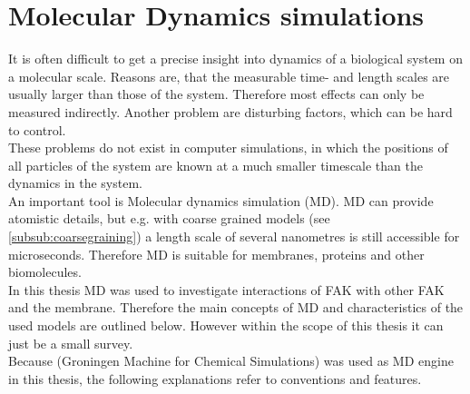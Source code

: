 \section{Molecular Dynamics simulations}
It is often difficult to get a precise insight into dynamics of a biological system on a molecular scale. Reasons are, that the measurable time- and length scales are usually larger than those of the system. Therefore most effects can only be measured indirectly. Another problem are disturbing factors, which can be hard to control.\\
These problems do not exist in computer simulations, in which the positions of all particles of the system are known at a much smaller timescale than the dynamics in the system.\\
An important tool is Molecular dynamics simulation (MD). MD can provide atomistic details, but e.g. with coarse grained models (see \autoref{subsub:coarsegraining}) a length scale of several nanometres is still accessible for microseconds. Therefore MD is suitable for membranes, proteins and other biomolecules.\\
In this thesis MD was used to investigate interactions of FAK with other FAK and the membrane. Therefore the main concepts of MD and characteristics of the used models are outlined below. However within the scope of this thesis it can just be a small survey.\\
Because \gromacs{} (Groningen Machine for Chemical Simulations) \autocites{gromacs1, gromacsManual} was used as MD engine in this thesis, the following explanations refer to \gromacs{} conventions and features.
